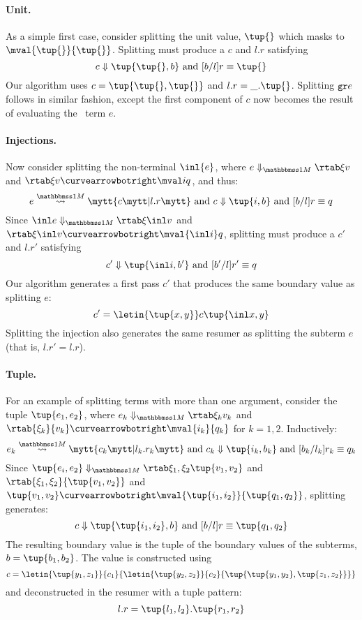\begin{abstrsyn}
\paragraph {Unit.} 
As a simple first case, consider splitting the unit value, $\tup{}$
which masks to $\mval {\tup{}} {\tup{}}$.
Splitting must produce a $c$ and $l.r$ satisfying
\[
	\reduce c {\tup{\tup{},b}} \text{ and } [b/l]r \equiv \tup{}
\]
Our algorithm uses $c=\tup{\tup{},\tup{}}$ and $l.r = \_.\tup{}$.
Splitting ${\tt gr}{e}$ follows in similar fashion, except the first 
component of $c$ now becomes the result of evaluating the \bbonep\ term $e$.

\paragraph {Injections.}
Now consider splitting the non-terminal $\inl {e}$, where $\diaone
{e} \xi v$ and $\rtab \xi v \vsplito \mval i q$, and thus:
\[
	\splitone e A c {l.r} \text{ and } \reduce c {\tup{i,b}} \text{ and } [b/l]r \equiv q
\]
Since $\diaone {\inl e} \xi {\inl v}$ and $\rtab \xi {\inl v} \vsplito \mval {\inl i} q$,
splitting must produce a $c'$ and $l.r'$ satisfying
\[
	\reduce {c'} {\tup{\inl i,b'}} \text{ and } [b'/l]r' \equiv q
\]
Our algorithm generates a first pass $c'$ that produces the same
boundary value as splitting $e$:
\[
c' = \letin {\tup {x,y}} c {\tup{\inl x, y}}
\]
Splitting the injection also generates the same resumer as splitting
the subterm $e$ (that is, $l.r' = l.r$).

\paragraph{Tuple.} For an example of splitting terms with more than one argument, consider the tuple $\tup{e_1,e_2}$,
where $\diaone {e_k} {\xi_k} {v_k}$ and 
$\rtab {\xi_k} {v_k} \vsplito \mval {i_k} {q_k}$ for $k = 1,2$.  
Inductively:
\[
	\splitone {e_k} A {c_k} {l_k.r_k} \text{ and } \reduce {c_k} {\tup{i_k,b_k}} \text{ and } [b_k/l_k]r_k \equiv q_k
\]
Since $\diaone {\tup{e_i,e_2}} {\xi_1,\xi_2} {\tup{v_1,v_2}}$ 
and $\rtab {\xi_1,\xi_2} {\tup{v_1,v_2}}$ and $\tup{v_1,v_2} \vsplito \mval {\tup{i_1,i_2}} {\tup{q_1,q_2}}$,
splitting generates:
\[
	\reduce {c} {\tup{\tup{i_1,i_2},b}} \text{ and } [b/l]r \equiv \tup{q_1,q_2}
\]
The resulting boundary value is the tuple of the boundary values of
the subterms, $b = \tup{b_1,b_2}$.  The value is 
constructed using
\[
c = \letin{\tup{y_1,z_1}}{c_1}{\letin{\tup{y_2,z_2}}{c_2}{\tup{\tup{y_1, y_2},\tup{z_1, z_2}}}}
\]
and deconstructed in the resumer with a tuple pattern:
\[
l.r = \tup{l_1,l_2}.\tup{r_1,r_2}
\]

\end{abstrsyn}
